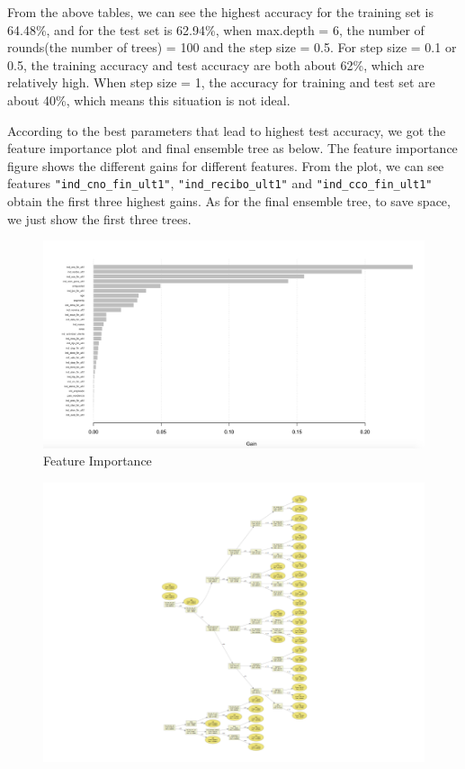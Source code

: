 \documentclass{article}
\begin{document}
\begin{spacing}{1}
\begin{large}
\noindent \indent From the above tables, we can see the highest accuracy for the training set is 64.48\%, and for the test set is 62.94\%, when max.depth = 6, the number of rounds(the number of trees) = 100 and the step size = 0.5. For step size = 0.1 or 0.5, the training accuracy and test accuracy are both about 62\%, which are relatively high. When step size = 1, the accuracy for training and test set are about 40\%, which means this situation is not ideal.

\noindent \indent According to the best parameters that lead to highest test accuracy, we got the feature importance plot and final ensemble tree as below. The feature importance figure shows the different gains for different features. From the plot, we can see features \verb|"ind_cno_fin_ult1"|, \verb|"ind_recibo_ult1"| and \verb|"ind_cco_fin_ult1"| obtain the first three highest gains. As for the final ensemble tree, to save space, we just show the first three trees.

\newpage
\begin{figure}[H]
\centering
\includegraphics[width = 160mm]{113.png}
\caption{Feature Importance}
\end{figure}

\begin{figure}[H]
\centering
\includegraphics[width = 160mm]{12.png}


\end{figure}
\end{large}
\end{spacing}
\end{document}
